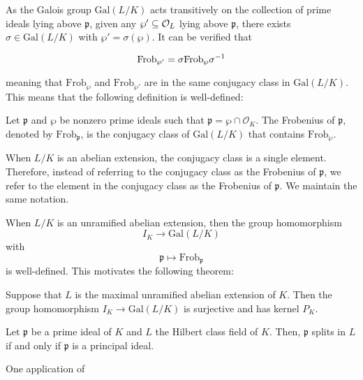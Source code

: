 As the Galois group $\textrm{Gal}(L/K)$ acts transitively on the collection of prime ideals lying above $\mathfrak{p}$, given any $\wp' \subseteq \mathcal{O}_{L}$ lying above $\mathfrak{p}$, there exists $\sigma \in \textrm{Gal}(L/K)$ with $\wp' = \sigma(\wp)$. It can be verified that

\[\textrm{Frob}_{\wp'} = \sigma \textrm{Frob}_\wp\sigma^{-1}\]

meaning that $\textrm{Frob}_{\wp}$ and $\textrm{Frob}_{\wp'}$ are in the same conjugacy class in $\textrm{Gal}(L/K)$. This means that the following definition is well-defined:

\begin{definition}
    Let $\mathfrak{p}$ and $\wp$ be nonzero prime ideals such that $\mathfrak{p} = \wp\cap \mathcal{O}_{K}$. The Frobenius of $\mathfrak{p}$, denoted by $\textrm{Frob}_{\mathfrak{p}}$, is the conjugacy class of $\textrm{Gal}(L/K)$ that contains $\textrm{Frob}_\wp$.
\end{definition}

When $L/K$ is an abelian extension, the conjugacy class is a single element. Therefore, instead of referring to the conjugacy class as the Frobenius of $\mathfrak{p}$, we refer to the element in the conjugacy class as the Frobenius of $\mathfrak{p}$. We maintain the same notation.

When $L/K$ is an unramified abelian extension, then the group homomorphism
    \[I_K \to \textrm{Gal}(L/K)\]
with
    \[\mathfrak{p} \mapsto \textrm{Frob}_{\mathfrak{p}}\]
is well-defined. This motivates the following theorem:

\begin{theorem}
    Suppose that $L$ is the maximal unramified abelian extension of $K$. Then the group homomorphism $I_K \to \textrm{Gal}(L/K)$ is surjective and has kernel $P_K$.
\end{theorem}

\begin{corollary}
    Let $\mathfrak{p}$ be a prime ideal of $K$ and $L$ the Hilbert class field of $K$. Then, $\mathfrak{p}$ splits in $L$ if and only if $\mathfrak{p}$ is a principal ideal.
\end{corollary}

One application of %

